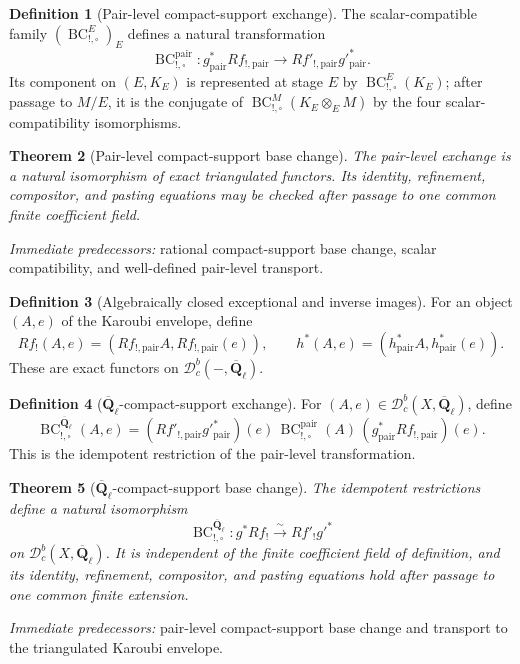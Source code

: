\documentclass[10pt]{article}
\newtheorem{theorem}{Theorem}[section]
\theoremstyle{definition}
\newtheorem{definition}[theorem]{Definition}
\newcommand{\Qlb}{\overline{\mathbf Q}_\ell}
\newcommand{\Dbc}{\mathcal D^b_c}
\newcommand{\pred}[1]{\par\smallskip\begingroup\footnotesize\raggedright
\emph{Immediate predecessors:} #1.\par\endgroup}
\begin{document}
\begin{definition}[Pair-level compact-support exchange]
The scalar-compatible family \((\operatorname{BC}^E_{!,\square})_E\)
defines a natural transformation
\[
 \operatorname{BC}^{\mathrm{pair}}_{!,\square}:
 g^*_{\mathrm{pair}}Rf_{!,\mathrm{pair}}
 \longrightarrow
 Rf'_{!,\mathrm{pair}}g'^*_{\mathrm{pair}}.
\]
Its component on \((E,K_E)\) is represented at stage \(E\) by
\(\operatorname{BC}^E_{!,\square}(K_E)\); after passage to \(M/E\), it is
the conjugate of \(\operatorname{BC}^M_{!,\square}(K_E\otimes_EM)\) by the
four scalar-compatibility isomorphisms.
\end{definition}

\begin{theorem}[Pair-level compact-support base change]
The pair-level exchange is a natural isomorphism of exact triangulated
functors.  Its identity, refinement, compositor, and pasting equations may
be checked after passage to one common finite coefficient field.
\end{theorem}
\pred{rational compact-support base change, scalar compatibility, and well-defined pair-level transport}

\begin{definition}[Algebraically closed exceptional and inverse images]
For an object \((A,e)\) of the Karoubi envelope, define
\[
 Rf_!(A,e)=
 (Rf_{!,\mathrm{pair}}A,Rf_{!,\mathrm{pair}}(e)),
 \qquad
 h^*(A,e)=
 (h^*_{\mathrm{pair}}A,h^*_{\mathrm{pair}}(e)).
\]
These are exact functors on \(\Dbc(-,\Qlb)\).
\end{definition}

\begin{definition}[\texorpdfstring{\(\Qlb\)}{Qbar-l}-compact-support exchange]
For \((A,e)\in\Dbc(X,\Qlb)\), define
\[
 \operatorname{BC}^{\Qlb}_{!,\square}(A,e)=
 (Rf'_{!,\mathrm{pair}}g'^*_{\mathrm{pair}})(e)\,
 \operatorname{BC}^{\mathrm{pair}}_{!,\square}(A)\,
 (g^*_{\mathrm{pair}}Rf_{!,\mathrm{pair}})(e).
\]
This is the idempotent restriction of the pair-level transformation.
\end{definition}

\begin{theorem}[\texorpdfstring{\(\Qlb\)}{Qbar-l}-compact-support base change]
The idempotent restrictions define a natural isomorphism
\[
 \operatorname{BC}^{\Qlb}_{!,\square}:
 g^*Rf_!\xrightarrow{\sim}Rf'_!g'^*
\]
on \(\Dbc(X,\Qlb)\).  It is independent of the finite coefficient field of definition,
and its identity, refinement, compositor, and pasting equations hold after
passage to one common finite extension.
\end{theorem}
\pred{pair-level compact-support base change and transport to the triangulated Karoubi envelope}
\end{document}
